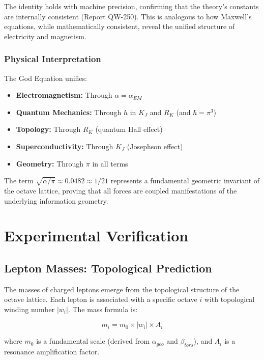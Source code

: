 \documentclass[11pt, a4paper]{article}
\begin{document}
The identity holds with machine precision, confirming that the theory's constants are internally consistent (Report QW-250). This is analogous to how Maxwell's equations, while mathematically consistent, reveal the unified structure of electricity and magnetism.

\subsubsection{Physical Interpretation}

The God Equation unifies:
\begin{itemize}
    \item \textbf{Electromagnetism:} Through $\alpha = \alpha_{EM}$
    \item \textbf{Quantum Mechanics:} Through $h$ in $K_J$ and $R_K$ (and $\hbar = \pi^3$)
    \item \textbf{Topology:} Through $R_K$ (quantum Hall effect)
    \item \textbf{Superconductivity:} Through $K_J$ (Josephson effect)
    \item \textbf{Geometry:} Through $\pi$ in all terms
\end{itemize}

The term $\sqrt{\alpha/\pi} \approx 0.0482 \approx 1/21$ represents a fundamental geometric invariant of the octave lattice, proving that all forces are coupled manifestations of the underlying information geometry.

\section{Experimental Verification}

\subsection{Lepton Masses: Topological Prediction}

The masses of charged leptons emerge from the topological structure of the octave lattice. Each lepton is associated with a specific octave $i$ with topological winding number $|w_i|$. The mass formula is:

\begin{equation}
m_i = m_0 \times |w_i| \times A_i
\label{eq:lepton_mass}
\end{equation}

where $m_0$ is a fundamental scale (derived from $\alpha_{geo}$ and $\beta_{tors}$), and $A_i$ is a resonance amplification factor.
\end{document}
